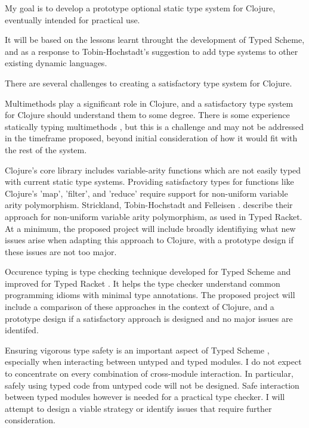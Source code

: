 \documentclass[12pt, a4paper]{article}
\begin{document}
My goal is to develop a prototype optional static type system for Clojure, 
eventually intended for practical use.

It will be based on the lessons learnt throught the development
of Typed Scheme, and as a response to Tobin-Hochstadt's \cite{TypedScheme:2010}
suggestion to add type systems to other existing dynamic languages.

There are several challenges to creating a satisfactory type system for Clojure.

Multimethods play a significant role in Clojure, and a satisfactory
type system for Clojure should understand them to some degree.
There is some experience statically typing multimethods
\cite{Millstein02modularstatically}, 
but this is a challenge and may not be addressed in the
timeframe proposed, beyond initial consideration of how it would
fit with the rest of the system.

Clojure's core library includes variable-arity functions which
are not easily typed with current static type systems. 
Providing satisfactory types for functions 
like Clojure's 'map', 'filter', and 'reduce' require
support for non-uniform variable arity polymorphism. 
Strickland, Tobin-Hochstadt and Felleisen \cite{Strickland:2009:PVP:1532974.1532978}.
describe their approach for non-uniform variable arity polymorphism, as used
in Typed Racket. 
At a minimum, the proposed project will include broadly identifiying 
what new issues arise when adapting this approach to Clojure, 
with a prototype design if these issues are not too major.

Occurence typing is type checking technique developed for Typed Scheme 
\cite{Tobin-Hochstadt:2008:DIT:1328897.1328486}
and improved for Typed Racket
\cite{Tobin-Hochstadt:2010:LTU:1932681.1863561}.
It helps the type checker understand common programming idioms 
with minimal type annotations.
The proposed project will include a comparison of these approaches in
the context of Clojure, and a prototype design if a satisfactory approach 
is designed and no major issues are identifed.

Ensuring vigorous type safety is an important aspect of Typed Scheme 
\cite{TypedScheme:2010} ,
especially when interacting between untyped and typed modules.
I do not expect to concentrate on every combination of cross-module
interaction. In particular, safely using typed code from untyped code
will not be designed. Safe interaction between typed modules
however is needed for a practical type checker. I
will attempt to design a viable strategy or identify issues that
require further consideration.
\end{document}
